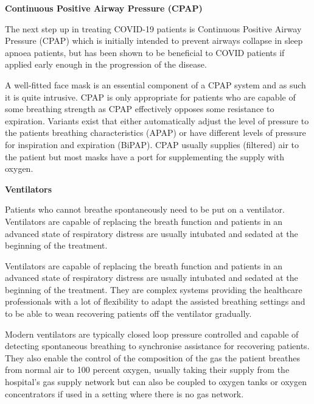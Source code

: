 \documentclass[12pt]{article}
\begin{document}
\textbf{Continuous Positive Airway Pressure (CPAP)}

\hspace{2cm}


The next step up in treating COVID-19 patients is Continuous Positive Airway Pressure (CPAP) which is initially intended to prevent airways collapse in sleep apnoea patients, but has been shown to be beneficial to COVID patients if applied early enough in the progression of the disease.

A well-fitted face mask is an essential component of a CPAP system and as such it is quite intrusive. CPAP is only appropriate for patients who are capable of some breathing strength as CPAP effectively opposes some resistance to expiration. Variants exist that either automatically adjust the level of pressure to the patients breathing characteristics (APAP) or have different levels of pressure for inspiration and expiration (BiPAP). CPAP usually supplies (filtered) air to the patient but most masks have a port for supplementing the supply with oxygen.



\hspace{3cm}


\textbf{Ventilators}

\hspace{2cm}


Patients who cannot breathe spontaneously need to be put on a ventilator. Ventilators are capable of replacing the breath function and patients in an advanced state of respiratory distress are usually intubated and sedated at the beginning of the treatment.

Ventilators are capable of replacing the breath function and patients in an advanced state of respiratory distress are usually intubated and sedated at the beginning of the treatment. They are complex systems providing the healthcare professionals with a lot of flexibility to adapt the assisted breathing settings and to be able to wean recovering patients off the ventilator gradually.

Modern ventilators are typically closed loop pressure controlled and capable of detecting spontaneous breathing to synchronise assistance for recovering patients. They also enable the control of the composition of the gas the patient breathes from normal air to 100 percent oxygen, usually taking their supply from the hospital’s gas supply network but can also be coupled to oxygen tanks or oxygen concentrators if used in a setting where there is no gas network.
\end{document}

